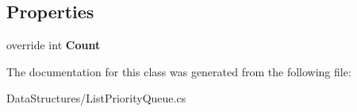 \subsection*{Properties}
\begin{DoxyCompactItemize}
\item 
\mbox{\label{class_data_structures_1_1_list_priority_queue_a7bc9b2551d95ed8d9a56376d2098e4eb}} 
override int {\bfseries Count}
\end{DoxyCompactItemize}


The documentation for this class was generated from the following file\+:\begin{DoxyCompactItemize}
\item 
Data\+Structures/List\+Priority\+Queue.\+cs\end{DoxyCompactItemize}
